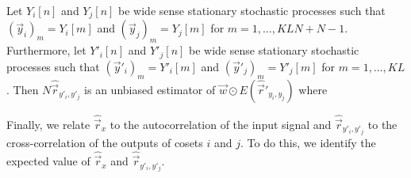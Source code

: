 \documentclass[a4paper, openany, oneside]{memoir}
\begin{document}
\begin{blockTheorem} 
    Let $Y_i[n]$ and $Y_j[n]$ be wide sense stationary stochastic processes such that $(\vec{y}_i)_m = Y_i[m]$ and $(\vec{y}_j)_m = Y_j[m]$ for $m=1,\ldots,KLN+N-1$. Furthermore, let $Y'_i[n]$ and $Y'_j[n]$ be wide sense stationary stochastic processes such that $(\vec{y}'_i)_m = Y'_i[m]$ and $(\vec{y}'_j)_m = Y'_j[m]$ for $m=1,\ldots,KL$. Then $N\hat{\vec{r}}_{y'_i,y'_j}$ is an unbiased estimator of $\vec{w} \odot E(\hat{\vec{r}}'_{y_i,y_j})$ where

\end{blockTheorem}

Finally, we relate $\hat{\vec{r}}_x$ to the autocorrelation of the input signal and $\hat{\vec{r}}_{y'_i,y'_j}$ to the cross-correlation of the outputs of cosets $i$ and $j$. To do this, we identify the expected value of $\hat{\vec{r}}_x$ and $\hat{\vec{r}}_{y'_i,y'_j}$.
\end{document}
